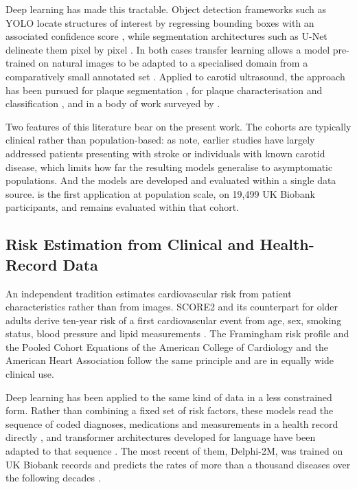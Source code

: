 Deep learning has made this tractable. Object detection frameworks such as YOLO locate
structures of interest by regressing bounding boxes with an associated confidence score
\cite{redmon2016yolo}, while segmentation architectures such as U-Net delineate them pixel by
pixel \cite{ronneberger2015unet}. In both cases transfer learning allows a model pre-trained on
natural images to be adapted to a specialised domain from a comparatively small annotated set
\cite{shin2016transfer}.
Applied to carotid ultrasound, the approach has been pursued for plaque segmentation
\cite{jain2021hybrid}, for plaque characterisation and classification
\cite{singh2024plaque}, and in a body of work surveyed by \textcite{huang2023review}.

Two features of this literature bear on the present work. The cohorts are typically clinical
rather than population-based: as \textcite{omarov2024deep} note, earlier studies have largely
addressed patients presenting with stroke or individuals with known carotid disease, which limits
how far the resulting models generalise to asymptomatic populations. And the models are
developed and evaluated within a single data source. \textcite{omarov2024deep} is the first
application at population scale, on 19{,}499 UK Biobank participants, and remains evaluated
within that cohort.

\subsection{Risk Estimation from Clinical and Health-Record Data}

An independent tradition estimates cardiovascular risk from patient characteristics rather than
from images. SCORE2 and its counterpart for older adults derive ten-year risk of a first
cardiovascular event from age, sex, smoking status, blood pressure and lipid measurements
\cite{score22021, score2op2021}. The Framingham risk profile \cite{dagostino2008framingham}
and the Pooled Cohort Equations of the American College of Cardiology and the American Heart
Association \cite{goff2014pooled} follow the same principle and are in equally wide clinical
use.

Deep learning has been applied to the same kind of data in a less constrained form. Rather than
combining a fixed set of risk factors, these models read the sequence of coded diagnoses,
medications and measurements in a health record directly \cite{rajkomar2018scalable}, and
transformer architectures developed for language have been adapted to that sequence
\cite{li2020behrt}. The most recent of them, Delphi-2M, was trained on UK Biobank records and
predicts the rates of more than a thousand diseases over the following decades
\cite{shmatko2025delphi}.

